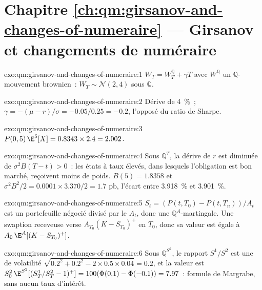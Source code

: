 \section*{Chapitre \ref{ch:qm:girsanov-and-changes-of-numeraire} --- Girsanov et changements de numéraire}

\begin{solution}{exo:qm:girsanov-and-changes-of-numeraire:1}
$W_T = W^{\mathbb Q}_T + \gamma T$ avec $W^{\mathbb Q}$ un $\mathbb Q$-mouvement brownien~: $W_T \sim \mathcal N(2, 4)$ sous $\mathbb Q$.
\end{solution}

\begin{solution}{exo:qm:girsanov-and-changes-of-numeraire:2}
Dérive de 4~\%~; $\gamma = -(\mu - r)/\sigma = -0.05/0.25 = -0.2$, l'opposé du ratio de Sharpe.
\end{solution}

\begin{solution}{exo:qm:girsanov-and-changes-of-numeraire:3}
$P(0,5)\,\E^5[X] = 0.8343 \times 2.4 = 2.002$.
\end{solution}

\begin{solution}{exo:qm:girsanov-and-changes-of-numeraire:4}
Sous $\mathbb Q^T$, la dérive de $r$ est diminuée de $\sigma^2B(T - t) > 0$~: les états à taux élevés, dans lesquels l'obligation est bon marché,
reçoivent moins de poids. $B(5) = 1.8358$ et $\sigma^2B^2/2 = 0.0001 \times 3.370/2 = 1.7$ pb, l'écart entre
3.918~\% et 3.901~\%.
\end{solution}

\begin{solution}{exo:qm:girsanov-and-changes-of-numeraire:5}
$S_t = (P(t,T_0) - P(t,T_n))/A_t$ est un portefeuille négocié divisé par le  $A_t$, donc une
$\mathbb Q^A$-martingale. Une swaption receveuse verse $A_{T_0}(K - S_{T_0})^+$ en $T_0$, donc sa valeur est égale à $A_0\,\E^A[(K -
S_{T_0})^+]$.
\end{solution}

\begin{solution}{exo:qm:girsanov-and-changes-of-numeraire:6}
Sous $\mathbb Q^{S^2}$, le rapport $S^1/S^2$ est une  de volatilité $\sqrt{0.2^2 + 0.2^2 - 2 \times 0.5
\times 0.04} = 0.2$, et la valeur est $S^2_0\,\E^{S^2}[(S^1_T/S^2_T - 1)^+] = 100(\Phi(0.1) - \Phi(-0.1)) = 7.97$~:
formule de Margrabe, sans aucun taux d'intérêt.
\end{solution}

